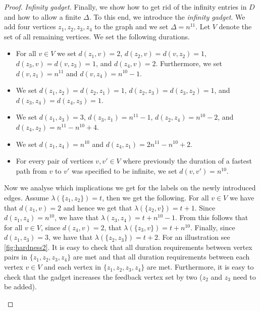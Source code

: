 \documentclass[a4paper,UKenglish,cleveref, autoref, thm-restate,anonymous]{lipics-v2021}
\begin{document}
\begin{proof}
\emph{Infinity gadget.} Finally, we show how to get rid of the infinity entries in $D$ and how to allow a finite $\Delta$. To this end, we introduce the \emph{infinity gadget}. We add four vertices $z_1, z_2, z_3, z_4$ to the graph and we set $\Delta=n^{11}$. Let $V$ denote the set of all remaining vertices. We set the following durations.
\begin{itemize}
    \item For all $v\in V$ we set $d(z_1,v)=2$, $d(z_2,v)=d(v,z_2)=1$, $d(z_3,v)=d(v,z_3)=1$, and $d(z_4,v)=2$.
    Furthermore, we set $d(v,z_1)=n^{11}$ and $d(v,z_4)=n^{10}-1$.
    \item We set $d(z_1,z_2)=d(z_2,z_1)=1$, $d(z_2,z_3)=d(z_3,z_2)=1$, and $d(z_3,z_4)=d(z_4,z_3)=1$.
    \item We set $d(z_1,z_3)=3$, $d(z_3,z_1)=n^{11}-1$, $d(z_2,z_4)=n^{10}-2$, and $d(z_4,z_2)=n^{11}-n^{10}+4$.
    \item We set $d(z_1,z_4)=n^{10}$ and $d(z_4,z_1)=2n^{11}-n^{10}+2$.
    \item For every pair of vertices $v,v'\in V$ where previously the duration of a fastest path from $v$ to $v'$ was specified to be infinite, we set $d(v,v')=n^{10}$.
\end{itemize}
Now we analyse which implications we get for the labels on the newly introduced edges.
Assume $\lambda(\{z_1,z_2\})=t$, then we get the following.
    For all $v\in V$ we have that $d(z_1,v)=2$ and hence we get that $\lambda(\{z_2,v\})=t+1$. 
    Since $d(z_1,z_4)=n^{10}$, we have that $\lambda(z_3,z_4)=t+n^{10}-1$.
    From this follows that for all $v\in V$, since $d(z_4,v)=2$, that $\lambda(\{z_3,v\})=t+n^{10}$.
    Finally, since $d(z_1,z_3)=3$, we have that $\lambda(\{z_2,z_3\})=t+2$.
For an illustration see \cref{fig:hardness2}. It is easy to check that all duration requirements between vertex pairs in $\{z_1,z_2,z_3,z_4\}$ are met and that all duration requirements between each vertex $v\in V$ and each vertex in  $\{z_1,z_2,z_3,z_4\}$ are met. Furthermore, it is easy to check that the gadget increases the feedback vertex set by two ($z_2$ and $z_3$ need to be added).

\begin{figure}[t]
\centering
\begin{tikzpicture}[line width=1pt, scale=.65,yscale=.7]
\scriptsize



\end{tikzpicture}
\end{figure}
\end{proof}
\end{document}
